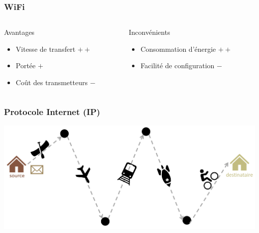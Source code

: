\documentclass[aspectratio=169,utf8,french]{beamer}
\begin{document}
\begin{frame}
  \frametitle{WiFi}
  \begin{columns}[t]
    \begin{column}{0.5\textwidth}
      Avantages
      \begin{itemize}
        \item Vitesse de transfert $ ++ $
        \item Portée $ + $
        \item Coût des transmetteurs $ - $
      \end{itemize}
    \end{column}
    \begin{column}{0.5\textwidth}
      Inconvénients
      \begin{itemize}
        \item Consommation d'énergie $ ++ $
        \item Facilité de configuration $ - $
      \end{itemize}
    \end{column}
  \end{columns}
\end{frame}

\begin{frame}
  \frametitle{Protocole Internet (IP)}
  \includegraphics[width=\linewidth]{pictures/routing.png}
\end{frame}
\end{document}
